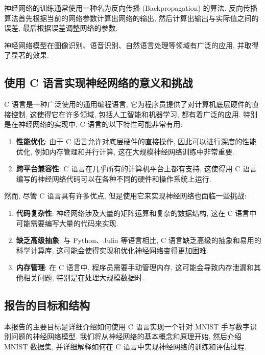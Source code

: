 \documentclass{ctexart}
\begin{document}
神经网络的训练通常使用一种名为反向传播 (Backpropagation) 的算法.
反向传播算法首先根据当前的网络参数计算出网络的输出, 然后计算出输出与实际值之间的误差,
最后根据误差调整网络的参数\cite{rumelhart1986learning}.

神经网络模型在图像识别、语音识别、自然语言处理等领域有广泛的应用,
并取得了显著的效果\cite{lecun2015deep}.

\subsection{使用 C 语言实现神经网络的意义和挑战}

C 语言是一种广泛使用的通用编程语言, 它为程序员提供了对计算机底层硬件的直接控制, 这使得它在许多领域,
包括人工智能和机器学习, 都有着广泛的应用\cite{ritchie1978c}. 特别是在神经网络的实现中, C 语言的以下特性可能非常有用:
\begin{enumerate}
    \item {\bfseries 性能优化}: 由于 C 语言允许对底层硬件的直接操作, 因此可以进行深度的性能优化,
          例如内存管理和并行计算, 这在大规模神经网络训练中非常重要\cite{chellapilla2006high}.
    \item {\bfseries 跨平台兼容性}: C 语言在几乎所有的计算机平台上都有支持,
          这使得用 C 语言编写的神经网络代码可以在各种不同的硬件和操作系统上运行\cite{ritchie1978c}.
\end{enumerate}

然而, 尽管 C 语言具有许多优点, 但是使用它来实现神经网络也面临一些挑战:
\begin{enumerate}
    \item {\bfseries 代码复杂性}: 神经网络涉及大量的矩阵运算和复杂的数据结构, 这在 C 语言中可能需要编写大量的代码来实现\cite{buck2010cuda}.
    \item {\bfseries 缺乏高级抽象}: 与 Python、Julia 等语言相比, C 语言缺乏高级的抽象和易用的科学计算库,
          这可能会使得实现和优化神经网络变得更加困难\cite{van2011numpy}.
    \item {\bfseries 内存管理}: 在 C 语言中, 程序员需要手动管理内存, 这可能会导致内存泄漏和其他相关问题,
          特别是在处理大规模数据时\cite{wilson1995memory}.
\end{enumerate}

\subsection{报告的目标和结构}

本报告的主要目标是详细介绍如何使用 C 语言实现一个针对 MNIST 手写数字识别问题的神经网络模型.
我们将从神经网络的基本概念和原理开始, 然后介绍 MNIST 数据集, 并详细解释如何在 C 语言中实现神经网络的训练和评估过程.
\end{document}
